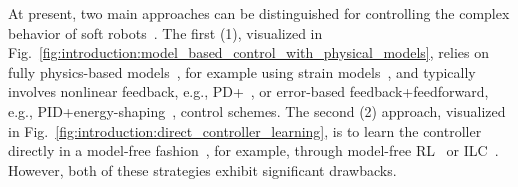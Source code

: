At present, two main approaches can be distinguished for controlling the complex behavior of soft robots~\citep{thuruthel2018control, della2023model}. The first (1), visualized in Fig.~\ref{fig:introduction:model_based_control_with_physical_models}, relies on fully physics-based models~\citep{armanini2023soft}, for example using strain models~\citep{alessi2024rod}, and typically involves nonlinear feedback, e.g., PD+~\citep{della2020model}, or error-based feedback+feedforward, e.g., PID+energy-shaping~\citep{della2023model, caasenbrood2023control, soleti2025model}, control schemes. %
The second (2) approach, visualized in Fig.~\ref{fig:introduction:direct_controller_learning}, is to learn the controller directly in a model-free fashion~\citep{george2017learning}, for example, through model-free \gls{RL}~\citep{morimoto2021model, jitosho2023reinforcement, alessi2024pushing} or \gls{ILC}~\citep{hofer2019iterative, pierallini2023provably}. However, both of these strategies exhibit significant drawbacks.

